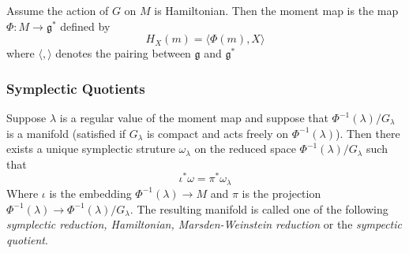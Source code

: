 \begin{defn}

Assume the action of $G$ on $M$ is Hamiltonian. Then the moment map is the map $ \Phi: M \to \mathfrak{g}^*$ defined by 
\[
	H_X(m) = \langle \Phi(m), X  \rangle
\]
where $ \langle , \rangle $ denotes the pairing between $ \mathfrak{g}$ and $ \mathfrak{g}^*$

\end{defn}

\subsubsection{Symplectic Quotients}

\begin{thm}

	Suppose $ \lambda$ is a regular value of the moment map and suppose that $ \Phi^{-1}( \lambda) / G_{ \lambda}$ is a manifold (satisfied if $G_{ \lambda}$ is compact and acts freely on  $ \Phi^{-1}( \lambda)$). Then there exists a unique symplectic struture $ \omega_{ \lambda}$ on the reduced space $ \Phi^{-1}( \lambda ) / G_{ \lambda }$ such that
	\[
	\iota^* \omega = \pi^* \omega_{ \lambda }
	\]
	Where $ \iota$ is the embedding $ \Phi^{-1}( \lambda) \to M$ and $ \pi$ is the projection $ \Phi^{-1}( \lambda ) \to \Phi^{-1}( \lambda) / G_{ \lambda }$. The resulting manifold is called one of the following \textit{symplectic reduction, Hamiltonian, Marsden-Weinstein reduction} or the \textit{sympectic quotient}.

\end{thm}
















